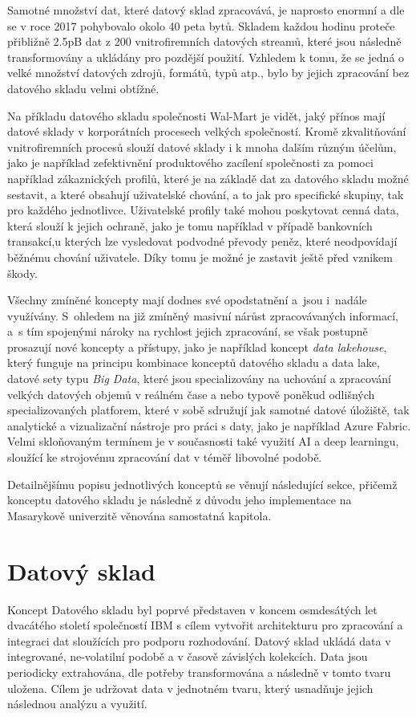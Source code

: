 \documentclass[
  digital,     %
  twoside,     %
  lof,         %
  lot,         %
]{fithesis4}
\begin{document}
Samotné množství dat, které datový sklad zpracovává, je naprosto enormní a dle \citeauthor{Marr2017} se v roce 2017 pohybovalo okolo 40 peta bytů. Skladem každou hodinu proteče přibližně 2.5pB dat z 200 vnitrofiremních datových streamů, které jsou následně transformovány a ukládány pro pozdější použití.\parencite{Marr2017} Vzhledem k tomu, že se jedná o velké množství datových zdrojů, formátů, typů atp., bylo by jejich zpracování bez datového skladu velmi obtížné.

Na příkladu datového skladu společnosti Wal-Mart je vidět, jaký přínos mají datové sklady v korporátních procesech velkých společností. Kromě zkvalitňování vnitrofiremních procesů slouží datové sklady i k mnoha dalším různým účelům, jako je například zefektivnění produktového zacílení společnosti za pomoci například zákaznických profilů, které je na základě dat za datového skladu možné sestavit, a které obsahují uživatelské chování, a to jak pro specifické skupiny, tak pro každého jednotlivce. Uživatelské profily také mohou poskytovat cenná data, která slouží k jejich ochraně, jako je tomu například v případě bankovních transakcí,u kterých lze vysledovat podvodné převody peněz, které neodpovídají běžnému chování uživatele. Díky tomu je možné je zastavit ještě před vznikem škody.\parencite{Inmon2008}

Všechny zmíněné koncepty mají dodnes své opodstatnění a jsou i nadále využívány. S ohledem na již zmíněný masivní nárůst zpracovávaných informací, a s tím spojenými nároky na rychlost jejich zpracování, se však postupně prosazují nové koncepty a přístupy, jako je například koncept \emph{data lakehouse}, který funguje na principu kombinace konceptů datového skladu a data lake, datové sety typu \emph{Big Data}, které jsou specializovány na uchování a zpracování velkých datových objemů v reálném čase a nebo typově poněkud odlišných specializovaných platforem, které v sobě sdružují jak samotné datové úložiště, tak analytické a vizualizační nástroje pro práci s daty, jako je například Azure Fabric. Velmi skloňovaným termínem je v současnosti také využití AI a deep learningu, sloužící ke strojovému zpracování dat v téměř libovolné podobě.  

Detailnějšímu popisu jednotlivých konceptů se věnují následující sekce, přičemž konceptu datového skladu je následně z důvodu jeho implementace na Masarykově univerzitě věnována samostatná kapitola.

\section{Datový sklad}
Koncept Datového skladu byl poprvé představen v koncem osmdesátých let dvacátého století společností IBM s cílem vytvořit architekturu pro zpracování a integraci dat sloužících pro podporu rozhodování. Datový sklad ukládá data v integrované, ne-volatilní podobě a v časově závislých kolekcích. Data jsou periodicky extrahována, dle potřeby transformována a následně v tomto tvaru uložena. Cílem je udržovat data v jednotném tvaru, který usnadňuje jejich následnou analýzu a využití.\parencite[s.~3]{Nambiar2022}
\end{document}

